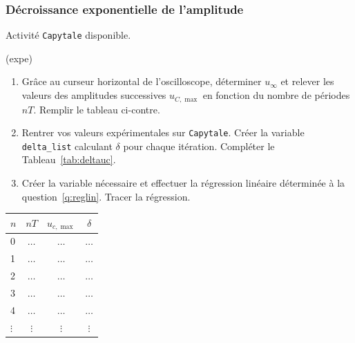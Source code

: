 \documentclass[../main/main.tex]{subfiles}
\begin{document}
\subsubsection{Décroissance exponentielle de l'amplitude}

Activité \texttt{Capytale} disponible.
\begin{tcb}(expe){}
	\begin{isd}[righthand ratio=.35]
		\begin{enumerate}
			\item Grâce au curseur horizontal de l'oscilloscope, déterminer
			      $u_{\infty}$ et relever les valeurs des amplitudes successives
			      $u_{C,\max}$ en fonction du nombre de périodes $nT$. Remplir le
			      tableau ci-contre.
			\item Rentrer vos valeurs expérimentales sur \texttt{Capytale}.
			      Créer la variable \texttt{delta\_list} calculant $\delta$ pour
			      chaque itération. Compléter le Tableau~\ref{tab:deltauc}.
			\item Créer la variable nécessaire et effectuer la régression linéaire
			      déterminée à la question~\ref{q:reglin}. Tracer la régression.
		\end{enumerate}
		\tcblower
		\begin{center}
			\label{tab:deltauc}
			\begin{tabular}{lccc}
				\toprule
				$n$      & $nT$     & $u_{c, \max}$ & $\delta $ \\
				\midrule
				0        & $\ldots$ & $\ldots$      & $\ldots$  \\
				1        & $\ldots$ & $\ldots$      & $\ldots$  \\
				2        & $\ldots$ & $\ldots$      & $\ldots$  \\
				3        & $\ldots$ & $\ldots$      & $\ldots$  \\
				4        & $\ldots$ & $\ldots$      & $\ldots$  \\
				$\vdots$ & $\vdots$ & $\vdots$      & $\vdots$  \\
				\bottomrule
			\end{tabular}
		\end{center}
	\end{isd}

\end{tcb}

\end{document}
